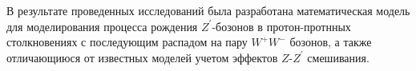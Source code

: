 В результате проведенных исследований была разработана
математическая модель для моделирования процесса рождения ${Z}^{\prime}$-бозонов в протон-протнных столкновениях с последующим распадом на пару ${W}^{+}{W}^{-}$ бозонов, а также отличающиюся от известных моделей учетом эффектов $Z$-${Z}^{\prime}$ смешивания.